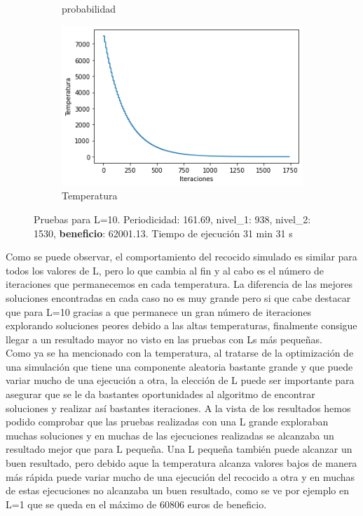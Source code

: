 \documentclass[a4paper,12pt]{article}
\begin{document}
\begin{figure}[H]
\begin{subfigure}{0.24\textwidth}
			\caption{probabilidad}
		\end{subfigure}
		\hfill
		\begin{subfigure}{0.24\textwidth}
			\centering
			\includegraphics[width=\textwidth]{include/L10/temperatura.png}
			\caption{Temperatura}
		\end{subfigure}
		\caption{Pruebas para L=10. Periodicidad: 161.69, nivel_1: 938,  nivel_2: 1530, \textbf{beneficio}: 62001.13. Tiempo de ejecución 31 min 31 s}
	\end{figure}


	
	Como se puede observar, el comportamiento del recocido simulado es similar para todos los valores de L, pero lo que cambia al fin y al cabo es el número de iteraciones que permanecemos en cada temperatura. La diferencia de las mejores soluciones encontradas en cada caso no es muy grande pero si que cabe destacar que para L=10 gracias a que permanece un gran número de iteraciones explorando soluciones peores debido a las altas temperaturas, finalmente consigue llegar a un resultado mayor no visto en las pruebas con Ls más pequeñas.\\

	Como ya se ha mencionado con la temperatura, al tratarse de la optimización de una simulación que tiene una componente aleatoria bastante grande y que puede variar mucho de una ejecución a otra, la elección de L puede ser importante para asegurar que se le da bastantes oportunidades al algoritmo de encontrar soluciones y realizar así bastantes iteraciones. A la vista de los resultados hemos podido comprobar que las pruebas realizadas con una L grande exploraban muchas soluciones y en muchas de las ejecuciones realizadas se alcanzaba un resultado mejor que para L pequeña. Una L pequeña también puede alcanzar un buen resultado, pero debido aque la temperatura alcanza valores bajos de manera más rápida puede variar mucho de una ejecución del recocido a otra y en muchas de estas ejecuciones no alcanzaba un buen resultado, como se ve por ejemplo en L=1 que se queda en el máximo de 60806 euros de beneficio.
\end{document}
